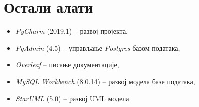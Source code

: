 \section{Остали алати}

\begin{itemize}[noitemsep]
    \item \textit{PyCharm} (2019.1) -- развој пројекта,
    \item \textit{PgAdmin} (4.5) -- управљање \textit{Postgres} базом података,
    \item \textit{Overleaf} -- писање документације,
    \item \textit{MySQL Workbench} (8.0.14) -- развој модела базе података,
    \item \textit{StarUML} (5.0) -- развој UML модела
\end{itemize}
